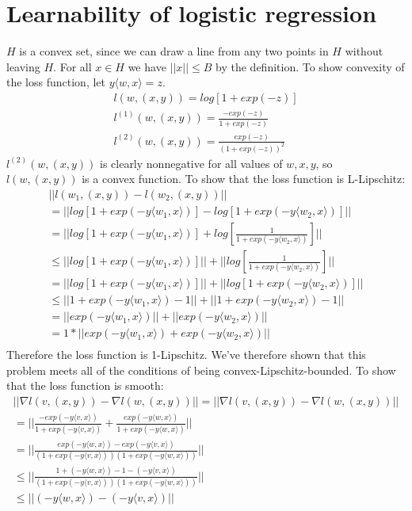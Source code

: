 \documentclass{article}
\begin{document}
\section{Learnability of logistic regression}
\(H\) is a convex set, since we can draw a line from any two points in \(H\) without leaving \(H\).
For all \(x \in H\) we have \( ||x|| \le B \) by the definition.
To show convexity of the loss function, let \(y \langle w,x \rangle =z\).
\begin{equation}
\begin{split}
l(w,(x,y)) = log[1+exp(-z)]\\
l^{(1)}(w,(x,y)) = \frac {-exp(-z)}{1+exp(-z)}\\
l^{(2)}(w,(x,y)) = \frac {exp(-z)}{(1+exp(-z))^2}
\end{split}
\end{equation}
\(l^{(2)}(w,(x,y))\) is clearly nonnegative for all values of \(w,x,y\), so \(l(w,(x,y))\) is a convex function.
To show that the loss function is L-Lipschitz:
\begin{equation}
\begin{split}
|| l(w_1,(x,y)) - l(w_2,(x,y)) || \\
= || log[1+exp(-y \langle w_1,x \rangle)] - log[1+exp(-y \langle w_2,x \rangle)] || \\
= || log[1+exp(-y \langle w_1,x \rangle)] + log[\frac {1}{1+exp(-y \langle w_2,x \rangle)}] || \\
\le || log[1+exp(-y \langle w_1,x \rangle)] || + || log[\frac {1}{1+exp(-y \langle w_2,x \rangle)}] || \\
= || log[1+exp(-y \langle w_1,x \rangle)] || + || log[1+exp(-y \langle w_2,x \rangle)] || \\
\le || 1+exp(-y \langle w_1,x \rangle) - 1 || + || 1+exp(-y \langle w_2,x \rangle)-1 || \\
= || exp(-y \langle w_1,x \rangle)  || + || exp(-y \langle w_2,x \rangle) ||\\
= 1*|| exp(-y \langle w_1,x \rangle)  + exp(-y \langle w_2,x \rangle) ||\\
\end{split}
\end{equation}
Therefore the loss function is 1-Lipschitz. We've therefore shown that this problem meets all of the conditions of being convex-Lipschitz-bounded.
To show that the loss function is smooth:
\begin{equation}
\begin{split}
|| \nabla{l(v,(x,y))} - \nabla{l(w,(x,y))} || = || \nabla{l(v,(x,y))} - \nabla{l(w,(x,y))} || \\ 
= || \frac {-exp(-y \langle v,x \rangle)}{1+exp(-y \langle v,x \rangle)} +  \frac {exp(-y \langle w,x \rangle)}{1+exp(-y \langle w,x \rangle)}||\\
= || \frac {exp(-y \langle w,x \rangle) - exp(-y \langle v,x \rangle)}{(1+exp(-y \langle v,x \rangle))(1+exp(-y \langle w,x \rangle))} || \\
\le || \frac {1+ (-y \langle w,x \rangle) - 1 -(-y \langle v,x \rangle)}{(1+exp(-y \langle v,x \rangle))(1+exp(-y \langle w,x \rangle))} || \\
\le || (-y \langle w,x \rangle) -(-y \langle v,x \rangle) ||
\end{split}
\end{equation}
\end{document}
